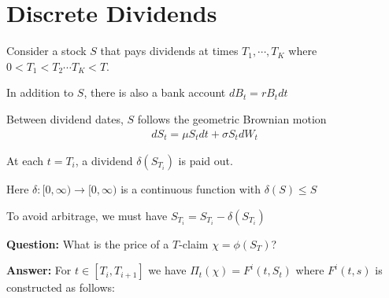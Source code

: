 \section{Discrete Dividends}
Consider a stock $S$ that pays dividends at times $T_1,\cdots,T_K$ where $0<T_1<T_2\cdots T_K<T$.\par
\noindent In addition to $S$, there is also a bank account $dB_t = rB_tdt$\par
\noindent Between dividend dates, $S$ follows the geometric Brownian motion
\begin{equation*}
  \begin{gathered}
    dS_t =\mu S_tdt+\sigma S_tdW_t
  \end{gathered}
\end{equation*}\par
\noindent At each $t = T_i$, a dividend $\delta(S_{T_i})$ is paid out.\par
\noindent Here $\delta:[0,\infty)\to[0,\infty)$ is a continuous function with $\delta(S)\leq S$\par
\noindent To avoid arbitrage, we must have $S_{T_i} = S_{T_i}-\delta(S_{T_i})$
\par\bigskip
\noindent\textbf{Question:} What is the price of a $T$-claim $\chi = \phi(S_T)$?\par
\noindent\textbf{Answer:} For $t\in[T_i,T_{i+1}]$ we have $\Pi_t(\chi) =F^i(t,S_t)$ where $F^i(t,s)$ is constructed as follows:\par
